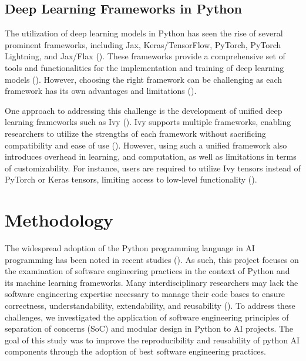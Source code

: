 \documentclass{article}
\begin{document}
\subsection{Deep Learning Frameworks in Python}

The utilization of deep learning models in Python has seen the rise of several prominent frameworks, including Jax, Keras/TensorFlow, PyTorch, PyTorch Lightning, and Jax/Flax (\cite{mihajlovic2020use,raschka2020machine, nguyen2019machine, shatnawi2018comparative}). These frameworks provide a comprehensive set of tools and functionalities for the implementation and training of deep learning models (\cite{elshawi2021dlbench}). 
However, choosing the right framework can be challenging as each framework has its own advantages and limitations (\cite{nguyen2019machine, elshawi2021dlbench,shatnawi2018comparative}).

One approach to addressing this challenge is the development of unified deep learning frameworks such as Ivy (\cite{ivy}). Ivy supports multiple frameworks, enabling researchers to utilize the strengths of each framework without sacrificing compatibility and ease of use (\cite{ivy}). However, using such a unified framework also introduces overhead in learning, and computation, as well as limitations in terms of customizability. For instance, users are required to utilize Ivy tensors instead of PyTorch or Keras tensors, limiting access to low-level functionality (\cite{IvyDocs, ivy}).


\section{Methodology}

The widespread adoption of the Python programming language in AI programming has been noted in recent studies (\cite{mihajlovic2020use,raschka2020machine}). As such, this project focuses on the examination of software engineering practices in the context of Python and its machine learning frameworks. Many interdisciplinary researchers may lack the software engineering expertise necessary to manage their code bases to ensure correctness, understandability, extendability, and reusability (\cite{amershi2019software,scully-debt-ml,leakage-recrisis,accountabilityInAi}). To address these challenges, we investigated the application of software engineering principles of separation of concerns (SoC) and modular design in Python to AI projects. The goal of this study was to improve the reproducibility and reusability of python AI components through the adoption of best software engineering practices.
\end{document}
